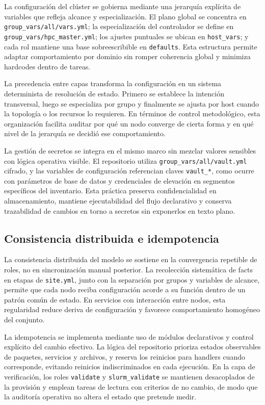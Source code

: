 La configuración del clúster se gobierna mediante una jerarquía explícita de variables que refleja alcance y especialización. El plano global se concentra en \texttt{group\_vars/all/vars.yml}; la especialización del controlador se define en \texttt{group\_vars/hpc\_master.yml}; los ajustes puntuales se ubican en \texttt{host\_vars}; y cada rol mantiene una base sobreescribible en \texttt{defaults}. Esta estructura permite adaptar comportamiento por dominio sin romper coherencia global y minimiza hardcodes dentro de tareas.

La precedencia entre capas transforma la configuración en un sistema determinista de resolución de estado. Primero se establece la intención transversal, luego se especializa por grupo y finalmente se ajusta por host cuando la topología o los recursos lo requieren. En términos de control metodológico, esta organización facilita auditar por qué un nodo converge de cierta forma y en qué nivel de la jerarquía se decidió ese comportamiento.

La gestión de secretos se integra en el mismo marco sin mezclar valores sensibles con lógica operativa visible. El repositorio utiliza \texttt{group\_vars/all/vault.yml} cifrado, y las variables de configuración referencian claves \texttt{vault\_*}, como ocurre con parámetros de base de datos y credenciales de elevación en segmentos específicos del inventario. Esta práctica preserva confidencialidad en almacenamiento, mantiene ejecutabilidad del flujo declarativo y conserva trazabilidad de cambios en torno a secretos sin exponerlos en texto plano.

\subsection{Consistencia distribuida e idempotencia}

La consistencia distribuida del modelo se sostiene en la convergencia repetible de roles, no en sincronización manual posterior. La recolección sistemática de facts en etapas de \texttt{site.yml}, junto con la separación por grupos y variables de alcance, permite que cada nodo reciba configuración acorde a su función dentro de un patrón común de estado. En servicios con interacción entre nodos, esta regularidad reduce deriva de configuración y favorece comportamiento homogéneo del conjunto.

La idempotencia se implementa mediante uso de módulos declarativos y control explícito del cambio efectivo. La lógica del repositorio prioriza estados observables de paquetes, servicios y archivos, y reserva los reinicios para handlers cuando corresponde, evitando reinicios indiscriminados en cada ejecución. En la capa de verificación, los roles \texttt{validate} y \texttt{slurm\_validate} se mantienen desacoplados de la provisión y emplean tareas de lectura con criterios de no cambio, de modo que la auditoría operativa no altera el estado que pretende medir.

